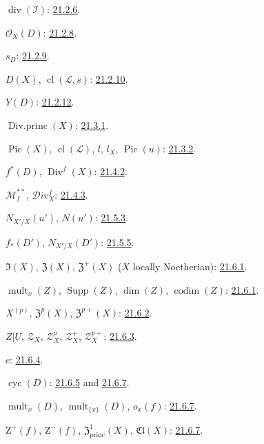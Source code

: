 $\operatorname{div}(\mathcal I)$: {\hyperlink{ega4.c04.prop.21-2-6}{21.2.6}}.

$\mathcal O_X(D)$: {\hyperlink{ega4.c04.statement.21-2-8}{21.2.8}}.

$s_D$: {\hyperlink{ega4.c04.statement.21-2-9}{21.2.9}}.

$D(X)$, $\operatorname{cl}(\mathcal L,s)$: {\hyperlink{ega4.c04.statement.21-2-10}{21.2.10}}.

$Y(D)$: {\hyperlink{ega4.c04.statement.21-2-12}{21.2.12}}.

$\operatorname{Div.princ}(X)$: {\hyperlink{ega4.c04.statement.21-3-1}{21.3.1}}.

$\operatorname{Pic}(X)$, $\operatorname{cl}(\mathcal L)$, $l$, $l_X$,
$\operatorname{Pic}(u)$: {\hyperlink{ega4.c04.statement.21-3-2}{21.3.2}}.

$f^*(D)$, $\operatorname{Div}^f(X)$: {\hyperlink{ega4.c04.def.21-4-2}{21.4.2}}.

$\mathcal M_f^{**}$, $\mathcal{D}iv_X^f$: {\hyperlink{ega4.c04.statement.21-4-3}{21.4.3}}.

$N_{X'/X}(u')$, $N(u')$: {\hyperlink{ega4.c04.statement.21-5-3}{21.5.3}}.

$f_*(D')$, $N_{X'/X}(D')$: {\hyperlink{ega4.c04.def.21-5-5}{21.5.5}}.

$\mathfrak I(X)$, $\mathfrak Z(X)$, $\mathfrak Z^+(X)$
($X$ locally Noetherian): {\hyperlink{ega4.c04.statement.21-6-1}{21.6.1}}.

$\operatorname{mult}_x(Z)$, $\operatorname{Supp}(Z)$,
$\dim(Z)$, $\operatorname{codim}(Z)$: {\hyperlink{ega4.c04.statement.21-6-1}{21.6.1}}.

$X^{(p)}$, $\mathfrak Z^p(X)$, $\mathfrak Z^{p+}(X)$:
{\hyperlink{ega4.c04.statement.21-6-2}{21.6.2}}.

$Z|U$, $\mathscr Z_X$, $\mathscr Z_X^p$, $\mathscr Z_X^+$,
$\mathscr Z_X^{p+}$: {\hyperlink{ega4.c04.statement.21-6-3}{21.6.3}}.

$c$: {\hyperlink{ega4.c04.statement.21-6-4}{21.6.4}}.

$\operatorname{cyc}(D)$: {\hyperlink{ega4.c04.statement.21-6-5}{21.6.5}} and
{\hyperlink{ega4.c04.statement.21-6-7}{21.6.7}}.

$\operatorname{mult}_x(D)$, $\operatorname{mult}_{\{x\}}(D)$,
$o_x(f)$: {\hyperlink{ega4.c04.statement.21-6-7}{21.6.7}}.

$\mathrm Z^+(f)$, $\mathrm Z^-(f)$, $\mathfrak Z^1_{\mathrm{princ}}(X)$,
$\mathfrak{Cl}(X)$: {\hyperlink{ega4.c04.statement.21-6-7}{21.6.7}}.

